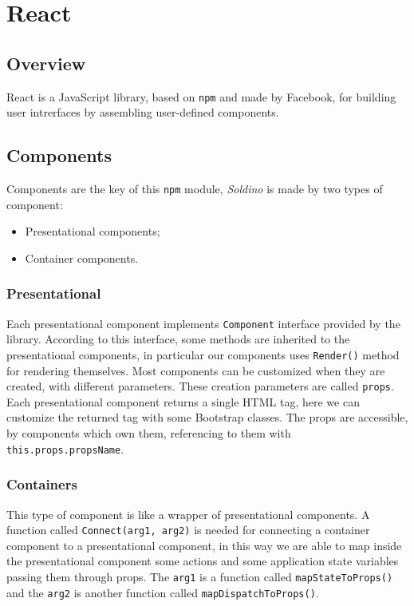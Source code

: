 \section{React} 

\subsection{Overview}
React is a JavaScript library, based on \texttt{npm} and made by Facebook, for building user intrerfaces by assembling user-defined components.
\subsection{Components}
Components are the key of this \texttt{npm} module, \textit{Soldino} is made by two types of component:
\begin{itemize}
	\item Presentational components;
	\item Container components.
\end{itemize}
\subsubsection{Presentational}
Each presentational component implements \texttt{Component} interface provided by the library. According to this interface, some methods are inherited to the presentational components, in particular our components uses \texttt{Render()} method for rendering themselves.
Most components can be customized when they are created, with different parameters. These creation parameters are called \texttt{props}. Each presentational component returns a single HTML tag, here we can customize the returned tag with some Bootstrap classes. The props are accessible, by components which own them, referencing to them with \texttt{this.props.propsName}.

\subsubsection{Containers} 
This type of component is like a wrapper of presentational components. A function called \texttt{Connect(arg1, arg2)} is needed for connecting a container component to a presentational component, in this way we are able to map inside the presentational component some actions and some application state variables passing them through props. The \texttt{arg1} is a function called \texttt{mapStateToProps()} and the \texttt{arg2} is another function called \texttt{mapDispatchToProps()}.
